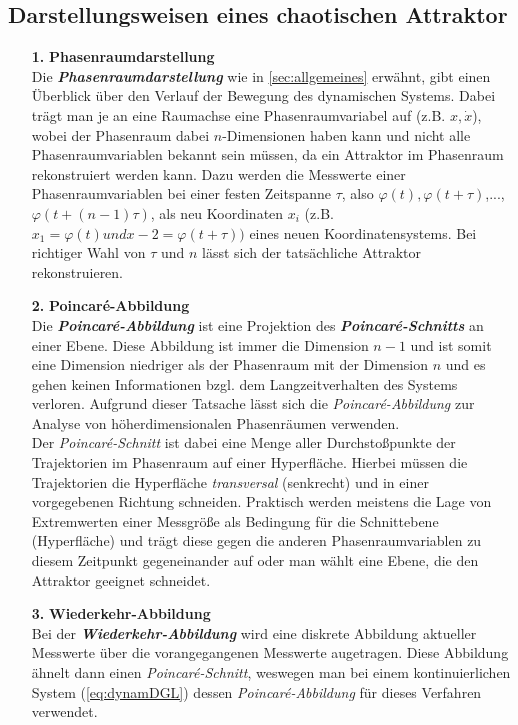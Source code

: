 \subsection{Darstellungsweisen eines chaotischen Attraktor}
\label{sub:darstellungAttraktor}
\begin{itemize}
    \item[\textbf{1.}]{\textbf{Phasenraumdarstellung}}\\
    Die \textit{\textbf{Phasenraumdarstellung}} wie in \ref{sec:allgemeines} erwähnt, gibt einen Überblick über den Verlauf der Bewegung des dynamischen Systems. Dabei trägt man je an eine Raumachse eine Phasenraumvariabel auf (z.B. $x, \dot{x}$), wobei der Phasenraum dabei $n$-Dimensionen haben kann und nicht alle Phasenraumvariablen bekannt sein müssen, da ein Attraktor im Phasenraum rekonstruiert werden kann. Dazu werden die Messwerte einer Phasenraumvariablen bei einer festen Zeitspanne $\tau$, also $\varphi(t), \varphi(t+\tau)$,..., $\varphi(t+(n-1)\tau)$, als neu Koordinaten $x_i$ (z.B. $x_1=\varphi(t) und x-2=\varphi(t+\tau))$ eines neuen Koordinatensystems. Bei richtiger Wahl von $\tau$ und $n$ lässt sich der tatsächliche Attraktor rekonstruieren. \citep{Lueck}
    \item[\textbf{2.}]{\textbf{Poincar\'e-Abbildung}}\\
    Die \textit{\textbf{Poincar\'e-Abbildung}} ist eine Projektion des \textit{\textbf{Poincar\'e-Schnitts}} an einer Ebene. Diese Abbildung ist immer die Dimension $n-1$ und ist somit eine Dimension niedriger als der Phasenraum mit der Dimension $n$ und es gehen keinen Informationen bzgl. dem Langzeitverhalten des Systems verloren. Aufgrund dieser Tatsache lässt sich die \textit{Poincar\'e-Abbildung} zur Analyse von höherdimensionalen Phasenräumen verwenden.\\
    Der \textit{Poincar\'e-Schnitt} ist dabei eine Menge aller Durchstoßpunkte der Trajektorien im Phasenraum auf einer Hyperfläche. Hierbei müssen die Trajektorien die Hyperfläche \textit{transversal} (senkrecht) und in einer vorgegebenen Richtung schneiden. Praktisch werden meistens die Lage von Extremwerten einer Messgröße als Bedingung für die Schnittebene (Hyperfläche) und trägt diese gegen die anderen Phasenraumvariablen zu diesem Zeitpunkt gegeneinander auf oder man wählt eine Ebene, die den Attraktor geeignet schneidet. \citep{Lueck}
    \item[\textbf{3.}]{\textbf{Wiederkehr-Abbildung}}\\
    Bei der \textit{\textbf{Wiederkehr-Abbildung}} wird eine diskrete Abbildung aktueller Messwerte über die vorangegangenen Messwerte augetragen. Diese Abbildung ähnelt dann einen \textit{Poincar\'e-Schnitt}, weswegen man bei einem kontinuierlichen System (\ref{eq:dynamDGL}) dessen \textit{Poincar\'e-Abbildung} für dieses Verfahren verwendet. \citep{Lueck}

\end{itemize}
